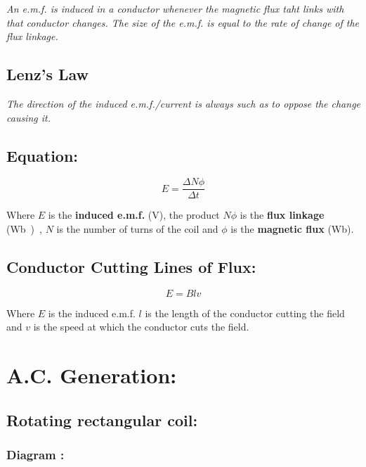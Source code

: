 \documentclass[11pt]{article}
\begin{document}
\begin{center}
	\textit{An e.m.f. is induced in a conductor whenever the magnetic flux taht links with that conductor changes. The size of the e.m.f. is equal to the rate of change of the flux linkage.}
\end{center}

\subsection{Lenz's Law}

\begin{center}
	\textit{The direction of the induced e.m.f./current is always such as to oppose the change causing it.}
\end{center}

\subsection{Equation: }

\begin{equation}
	E = \frac{\Delta N \phi}{\Delta t}\tag{\si\volt}
\end{equation}
\begin{center}
	Where $E$ is the \textbf{induced e.m.f.} (\si{\volt}), the product $N\phi$ is the \textbf{flux linkage} (\si\weber), $N$ is the number of turns of the coil and  $\phi$ is the \textbf{magnetic flux} (\si{\weber}).
\end{center}
\subsection{Conductor Cutting Lines of Flux: }
\begin{equation}
	E=Blv\tag{\si\volt}
\end{equation}
\begin{center}
	Where $E$ is the induced e.m.f. $l$ is the length of the conductor cutting the field and $v$ is the speed at which the conductor cuts the field.
\end{center}

\section{A.C. Generation: }
\subsection{Rotating rectangular coil: }
\subsubsection{Diagram : }
\end{document}

